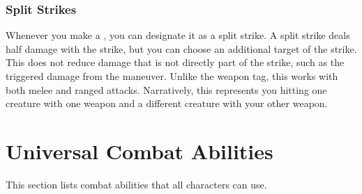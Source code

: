     \subsubsection{Split Strikes}
      Whenever you make a , you can designate it as a split strike.
      A split strike deals half damage with the strike, but you can choose an additional target of the strike.
      This does not reduce damage that is not directly part of the strike, such as the triggered damage from the  maneuver.
      Unlike the  weapon tag, this works with both melee and ranged attacks.
      Narratively, this represents you hitting one creature with one weapon and a different creature with your other weapon.

\section{Universal Combat Abilities}\label{Universal Combat Abilities}
  This section lists combat abilities that all characters can use.

